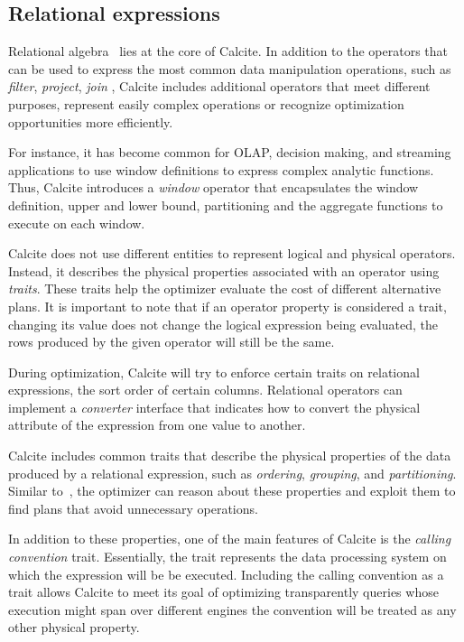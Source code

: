\subsection{Relational expressions}
\label{subsec:relexprs}

Relational algebra~\cite{DBLP:journals/cacm/Codd70} lies at the core of Calcite. In addition to the operators that can be used to express the most common data manipulation operations, such as \textit{filter}, \textit{project}, \textit{join} \etc , Calcite includes additional operators that meet different purposes, \eg represent easily complex operations or recognize optimization opportunities more efficiently.

For instance, it has become common for OLAP, decision making, and streaming applications to use window definitions to express complex analytic functions.  Thus, Calcite introduces a \textit{window} operator that encapsulates the window definition, \ie upper and lower bound, partitioning \etc and the aggregate functions to execute on each window.

 Calcite does not use different entities to represent logical and physical operators. Instead, it describes the physical properties associated with an operator using \textit{traits}. These traits help the optimizer evaluate the cost of different alternative plans. It is important to note that if an operator property is considered a trait, changing its value does not change the logical expression being evaluated, \ie the rows produced by the given operator will still be the same.

During optimization, Calcite will try to enforce certain traits on relational expressions, \eg the sort order of certain columns. Relational operators can implement a \textit{converter} interface that indicates how to convert the physical attribute of the expression from one value to another.

Calcite includes common traits that describe the physical properties of the data produced by a relational expression, such as \textit{ordering}, \textit{grouping}, and \textit{partitioning}. Similar to~\cite{DBLP:conf/icde/ZhouLC10}, the optimizer can reason about these properties and exploit them to find plans that avoid unnecessary operations.

In addition to these properties, one of the main features of Calcite is the \textit{calling convention} trait. Essentially, the trait represents the data processing system on which the expression will be be executed. Including the calling convention as a trait allows Calcite to meet its goal of optimizing transparently queries whose execution might span over different engines \ie the convention will be treated as any other physical property.


